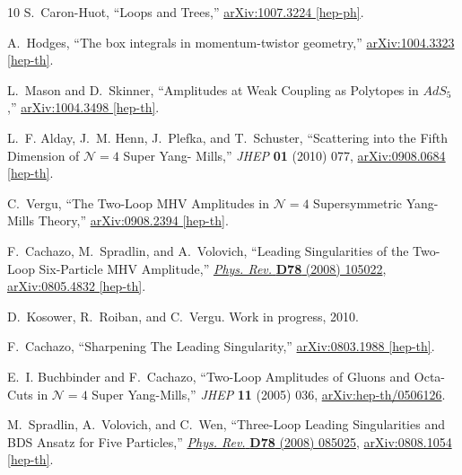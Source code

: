 \documentclass[11pt, reqno]{article}
\begin{document}
\begin{thebibliography}{10}
S.~Caron-Huot, ``{Loops and Trees},''
\href{http://arxiv.org/abs/1007.3224}{{ arXiv:1007.3224 [hep-ph]}}.

A.~Hodges, ``{The box integrals in momentum-twistor geometry},''
\href{http://arxiv.org/abs/1004.3323}{{ arXiv:1004.3323 [hep-th]}}.

L.~Mason and D.~Skinner, ``{Amplitudes at Weak Coupling as Polytopes in
  $AdS_5$},''
\href{http://arxiv.org/abs/1004.3498}{{ arXiv:1004.3498 [hep-th]}}.

L.~F. Alday, J.~M. Henn, J.~Plefka, and T.~Schuster, ``{Scattering into the
  Fifth Dimension of $\mathcal{N}=4$ Super Yang- Mills},'' {\em JHEP} {\bf 01}
  (2010)  077,
\href{http://arxiv.org/abs/0908.0684}{{ arXiv:0908.0684 [hep-th]}}.

C.~Vergu, ``{The Two-Loop MHV Amplitudes in $\mathcal{N}=4$ Supersymmetric
  Yang- Mills Theory},''
\href{http://arxiv.org/abs/0908.2394}{{ arXiv:0908.2394 [hep-th]}}.

F.~Cachazo, M.~Spradlin, and A.~Volovich, ``{Leading Singularities of the
  Two-Loop Six-Particle MHV Amplitude},''
  \href{http://dx.doi.org/10.1103/PhysRevD.78.105022}{{\em Phys. Rev.} {\bf
  D78} (2008)  105022},
\href{http://arxiv.org/abs/0805.4832}{{ arXiv:0805.4832 [hep-th]}}.

D.~Kosower, R.~Roiban, and C.~Vergu. Work in progress, 2010.

F.~Cachazo, ``{Sharpening The Leading Singularity},''
\href{http://arxiv.org/abs/0803.1988}{{ arXiv:0803.1988 [hep-th]}}.

E.~I. Buchbinder and F.~Cachazo, ``{Two-Loop Amplitudes of Gluons and Octa-Cuts
  in $\mathcal{N} = 4$ Super Yang-Mills},'' {\em JHEP} {\bf 11} (2005)  036,
\href{http://arxiv.org/abs/hep-th/0506126}{{ arXiv:hep-th/0506126}}.

M.~Spradlin, A.~Volovich, and C.~Wen, ``{Three-Loop Leading Singularities and
  BDS Ansatz for Five Particles},''
  \href{http://dx.doi.org/10.1103/PhysRevD.78.085025}{{\em Phys. Rev.} {\bf
  D78} (2008)  085025},
\href{http://arxiv.org/abs/0808.1054}{{ arXiv:0808.1054 [hep-th]}}.


\end{thebibliography}
\end{document}
